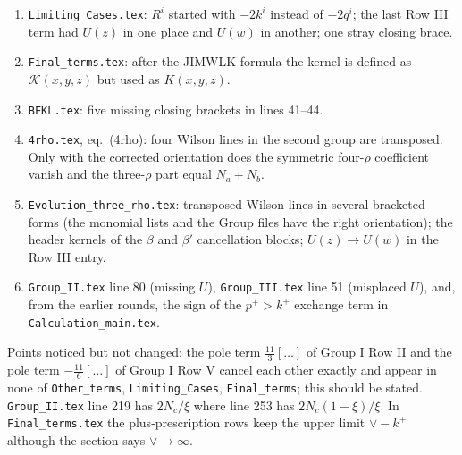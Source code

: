 \documentclass[10pt]{article}
\begin{document}
\begin{enumerate}
\item \texttt{Limiting\_Cases.tex}: $R^{i}$ started with $-2k^{i}$ instead of $-2q^{i}$; the last Row III term had $U(z)$ in one place and $U(w)$ in another; one stray closing brace.
\item \texttt{Final\_terms.tex}: after the JIMWLK formula the kernel is defined as $\mathcal{K}(x,y,z)$ but used as $K(x,y,z)$.
\item \texttt{BFKL.tex}: five missing closing brackets in lines 41--44.
\item \texttt{4rho.tex}, eq.~(4rho): four Wilson lines in the second group are transposed. Only with the corrected orientation does the symmetric four-$\rho$ coefficient vanish and the three-$\rho$ part equal $N_{a}+N_{b}$.
\item \texttt{Evolution\_three\_rho.tex}: transposed Wilson lines in several bracketed forms (the monomial lists and the Group files have the right orientation); the header kernels of the $\beta$ and $\beta'$ cancellation blocks; $U(z)\to U(w)$ in the Row III entry.
\item \texttt{Group\_II.tex} line 80 (missing $U$), \texttt{Group\_III.tex} line 51 (misplaced $U$), and, from the earlier rounds, the sign of the $p^{+}>k^{+}$ exchange term in \texttt{Calculation\_main.tex}.
\end{enumerate}
Points noticed but not changed: the pole term $\frac{11}{3}[\ldots]$ of Group I Row II and the pole term $-\frac{11}{6}[\ldots]$ of Group I Row V cancel each other exactly and appear in none of \texttt{Other\_terms}, \texttt{Limiting\_Cases}, \texttt{Final\_terms}; this should be stated. \texttt{Group\_II.tex} line 219 has $2N_{c}/\xi$ where line 253 has $2N_{c}(1-\xi)/\xi$. In \texttt{Final\_terms.tex} the plus-prescription rows keep the upper limit $\vee-k^{+}$ although the section says $\vee\to\infty$.
\end{document}
